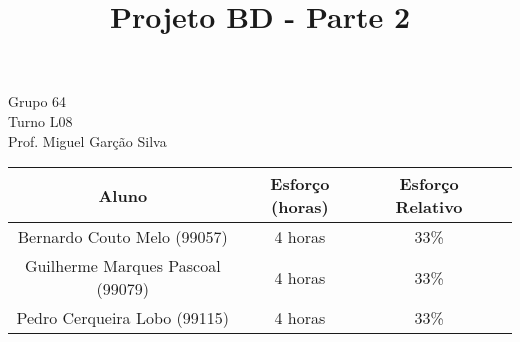 \documentclass{article}
\title{{\Huge Projeto BD - Parte 2}}
\author{}
\date{}
\begin{document}
	\maketitle
	\begin{center}
		{\LARGE Grupo 64}\\
		\vspace{8mm}
		{\LARGE Turno L08}\\
		\vspace{8mm}
		{\LARGE Prof. Miguel Garção Silva}\\

		\vspace{7cm}

		\begin{tabular}{|c|c|c|c|} \hline
			\textbf{Aluno} & \textbf{Esforço (horas)} & \textbf{Esforço Relativo}\\ \hline
			Bernardo Couto Melo (99057)	& 4 horas & 33\%\\ \hline
			Guilherme Marques Pascoal (99079) & 4 horas & 33\%\\ \hline
			Pedro Cerqueira Lobo (99115) & 4 horas & 33\%\\ \hline
		\end{tabular}

	\end{center}

	\pagebreak

\end{document}
